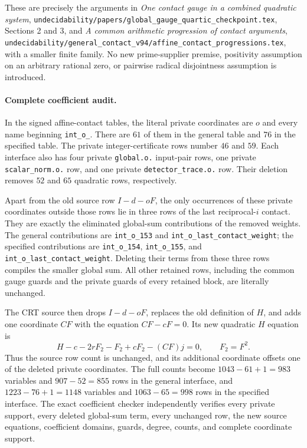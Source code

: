 These are precisely the arguments in
\emph{One contact gauge in a combined quadratic system},
\nolinkurl{undecidability/papers/global_gauge_quartic_checkpoint.tex},
Sections 2 and 3, and
\emph{A common arithmetic progression of contact arguments},
\nolinkurl{undecidability/general_contact_v94/affine_contact_progressions.tex},
with a smaller finite family. No new prime-supplier premise, positivity
assumption on an arbitrary rational zero, or pairwise radical
disjointness assumption is introduced.

\paragraph{Complete coefficient audit.}
In the signed affine-contact tables, the literal private coordinates
are $o$ and every name beginning \texttt{int\_o\_}. There are $61$
of them in the general table and $76$ in the specified table. The
private integer-certificate rows number $46$ and $59$. Each interface
also has four private \texttt{global.o.} input-pair rows, one private
\texttt{scalar\_norm.o.} row, and one private
\texttt{detector\_trace.o.} row. Their deletion removes $52$ and
$65$ quadratic rows, respectively.

Apart from the old source row $I-d-oF$, the only occurrences of these
private coordinates outside those rows lie in three rows of the last
reciprocal-$i$ contact. They are exactly the eliminated global-sum
contributions of the removed weights. The general contributions are
\texttt{int\_o\_153} and
\texttt{int\_o\_last\_contact\_weight}; the specified contributions
are \texttt{int\_o\_154}, \texttt{int\_o\_155}, and
\texttt{int\_o\_last\_contact\_weight}.
Deleting their terms from these three rows compiles the smaller global
sum. All other retained rows, including the common gauge guards and
the private guards of every retained block, are literally unchanged.

The CRT source then drops $I-d-oF$, replaces the old definition of $H$,
and adds one coordinate $CF$ with the equation $CF-cF=0$. Its new
quadratic $H$ equation is
\[
              H-c-2rF_2-F_2+cF_2-(CF)j=0,
              \qquad F_2=F^2.
\]
Thus the source row count is unchanged, and its additional coordinate
offsets one of the deleted private coordinates. The full counts become
$1043-61+1=983$ variables and $907-52=855$ rows in the general
interface, and $1223-76+1=1148$ variables and $1063-65=998$ rows in
the specified interface. The exact coefficient checker independently
verifies every private support, every deleted global-sum term, every
unchanged row, the new source equations, coefficient domains, guards,
degree, counts, and complete coordinate support.
